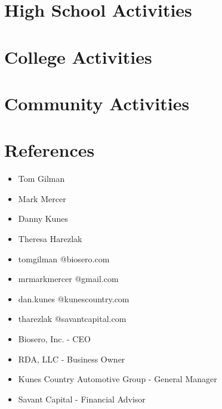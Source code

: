 \documentclass[12pt,a4paper,roman]{moderncv}        %
\begin{document}
\section{High School Activities}

\section{College Activities}

\section{Community Activities}

\vspace{2mm}

\section{References}
\begin{cvcolumns}
  	{\begin{itemize}
  	\item Tom Gilman \\
  	\item Mark Mercer \\
    \item Danny Kunes \\
    \item Theresa Harezlak
  	\end{itemize}}
  	{\begin{itemize}
  	\item tomgilman @biosero.com
    \item mrmarkmercer @gmail.com
    \item dan.kunes @kunescountry.com
    \item tharezlak @savantcapital.com
    \end{itemize}}
  	{\begin{itemize}
    \item Biosero, Inc.  - CEO \\
    \item RDA, LLC - Business Owner \\
    \item Kunes Country Automotive Group - General Manager
    \item Savant Capital - Financial Advisor 
    \end{itemize}}
\end{cvcolumns}
\end{document}
